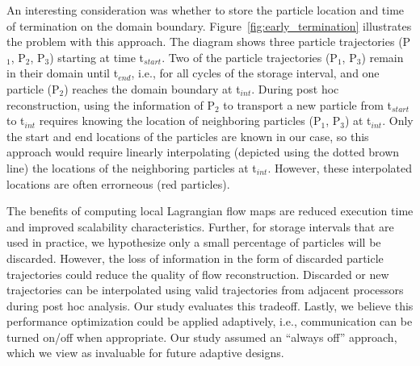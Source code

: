 %
An interesting consideration was whether to store the particle location and time of termination on the domain boundary.
%
Figure~\ref{fig:early_termination} illustrates the problem with this approach.
%
The diagram shows three particle trajectories (P$_{1}$, P$_{2}$, P$_{3}$) starting at time t$_{start}$.
%
Two of the particle trajectories (P$_{1}$, P$_{3}$) remain in their domain until t$_{end}$, i.e., for all cycles of the storage interval, and one particle (P$_{2}$) reaches the domain boundary at t$_{int}$.
%
During post hoc reconstruction, using the information of P$_{2}$ to transport a new particle from t$_{start}$ to t$_{int}$ requires knowing the location of neighboring particles (P$_{1}$, P$_{3}$) at t$_{int}$.
%
Only the start and end locations of the particles are known in our case, so this approach would require linearly interpolating (depicted using the dotted brown line) the locations of the neighboring particles at t$_{int}$.
%
However, these interpolated locations are often errorneous (red particles).
%
%

The benefits of computing local Lagrangian flow maps are reduced execution time and improved scalability characteristics. 
%
Further, for storage intervals that are used in practice, we hypothesize only a small percentage of particles will be discarded.
%
However, the loss of information in the form of discarded particle trajectories could reduce the quality of flow reconstruction.
%
Discarded or new trajectories can be interpolated using valid trajectories from adjacent processors during post hoc analysis.
%
Our study evaluates this tradeoff.
%
Lastly, we believe this performance optimization could be applied adaptively, i.e., communication can be turned on/off when appropriate.
%
Our study assumed an ``always off'' approach, which we view as invaluable for future adaptive designs.
%
%

